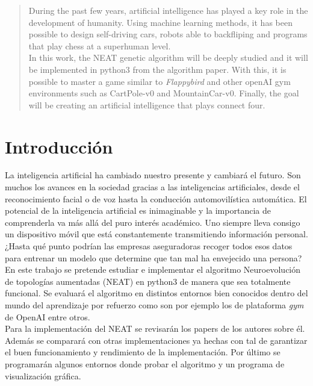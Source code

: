 \documentclass{article}
\begin{document}
\begin{abstract}
\setlength{\parindent}{0pt}
\noindent During the past few years, artificial intelligence has played a key role in the development of humanity. Using machine learning methods, it has been possible to design self-driving cars, robots able to backfliping and programs that play chess at a superhuman level.\\

In this work, the NEAT genetic algorithm will be deeply studied and it will be implemented in python3 from the algorithm paper. With this, it is possible to master a game similar to \textit{Flappybird} and other openAI gym environments such as CartPole-v0 and MountainCar-v0. Finally, the goal will be creating an artificial intelligence that plays connect four.
\end{abstract}

\newpage
\tableofcontents
\newpage
\section{Introducción}

La inteligencia artificial ha cambiado nuestro presente y cambiará el futuro. Son muchos los avances en la sociedad gracias a las inteligencias artificiales, desde el reconocimiento facial o de voz hasta la conducción automovilística automática. El potencial de la inteligencia artificial es inimaginable y la importancia de comprenderla va más allá del puro interés académico. Uno siempre lleva consigo un dispositivo móvil que está constantemente transmitiendo información personal. ¿Hasta qué punto podrían las empresas aseguradoras recoger todos esos datos para entrenar un modelo que determine que tan mal ha envejecido una persona?\\

En este trabajo se pretende estudiar e implementar el algoritmo Neuroevolución de topologías aumentadas (NEAT) en python3 de manera que sea totalmente funcional. Se evaluará el algoritmo en distintos entornos bien conocidos dentro del mundo del aprendizaje por refuerzo como son por ejemplo los de plataforma \textit{gym} de OpenAI entre otros.\\

Para la implementación del NEAT se revisarán los papers de los autores sobre él. Además se comparará con otras implementaciones ya hechas con tal de garantizar el buen funcionamiento y rendimiento de la implementación. Por último se programarán algunos entornos donde probar el algoritmo y un programa de visualización gráfica.\\
\end{document}
